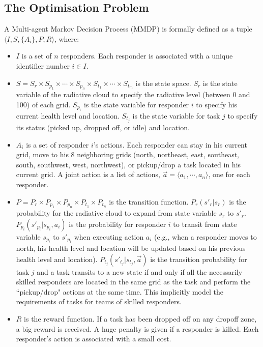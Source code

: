 \subsection{The Optimisation Problem}
A Multi-agent Markov Decision Process (MMDP) is formally defined as
a tuple $\langle I, S, \{A_i\}, P, R \rangle$, where:
\begin{itemize}
  \item $I$ is a set of $n$ responders. Each responder is
      associated with a unique identifier number $i\in I$.
  \item $S = S_r \times S_{p_1} \times \cdots \times S_{p_n}
      \times S_{t_1} \times \cdots \times S_{t_m}$ is the state
      space. $S_r$ is the state variable of the radiative cloud
      to specify the radiative level (between 0 and 100) of
      each grid. $S_{p_i}$ is the state variable for responder
      $i$ to specify his current health level and location.
      $S_{t_j}$ is the state variable for task $j$ to specify
      its status (picked up, dropped off, or idle) and
      location.
  \item $A_i$ is a set of responder $i$'s actions. Each
      responder can stay in his current grid, move to his 8
      neighboring grids (north, northeast, east, southeast,
      south, southwest, west, northwest), or pickup/drop a task
      located in his current grid. A joint action is a list of
      actions, $\vec{a}=\langle a_1, \cdots, a_n \rangle$, one
      for each responder.
  \item $P = P_r \times P_{p_1} \times P_{p_n} \times P_{t_1}
      \times P_{t_n}$ is the transition function.
      $P_r(s'_r|s_r)$ is the probability for the radiative
      cloud to expand from state variable $s_r$ to $s'_r$.
      $P_{p_i}(s'_{p_i}|s_{p_i}, a_i)$ is the probability for
      responder $i$ to transit from state variable $s_{p_i}$ to
      $s'_{p_i}$ when executing action $a_i$ (e.g., when a
      responder moves to north, his health level and location
      will be updated based on his previous health level and
      location). $P_{t_j}(s'_{t_j}|s_{t_j}, \vec{a})$ is the
      transition probability for task $j$ and a task transits
      to a new state if and only if all the necessarily skilled
      responders are located in the same grid as the task and
      perform the ``pickup/drop" actions at the same time. This
      implicitly model the requirements of tasks for teams of
      skilled responders.
  \item $R$ is the reward function. If a task has been dropped
      off on any dropoff zone, a big reward is received. A huge
      penalty is given if a responder is killed. Each
      responder's action is associated with a small cost.
\end{itemize}
